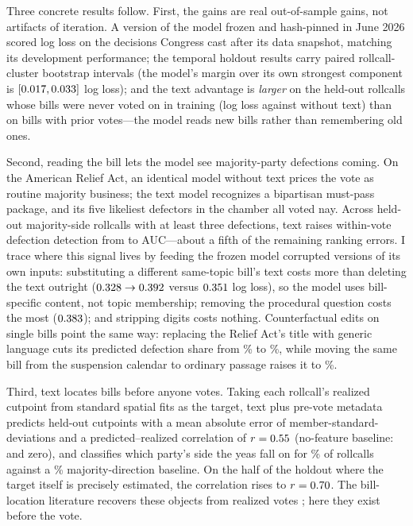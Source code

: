 \documentclass[12pt]{article}
\begin{document}
Three concrete results follow. First, the gains are real out-of-sample
gains, not artifacts of iteration. A version of the model frozen and
hash-pinned in June 2026 scored \prospectiveVoneLL{} log loss on the
\prospectiveN{} decisions Congress cast after its data snapshot,
matching its development performance; the temporal holdout results carry
paired rollcall-cluster bootstrap intervals (the model's margin over its
own strongest component is $[0.017, 0.033]$ log
loss); and the text advantage is \emph{larger} on the \freshRC{}
held-out rollcalls whose bills were never voted on in training (log loss
\freshLLchamp{} against \freshLLnotext{} without text) than on bills
with prior votes---the model reads new bills rather than remembering old
ones.

Second, reading the bill lets the model see majority-party defections
coming. On the American Relief Act, an identical model without text
prices the vote as routine majority business; the text model recognizes
a bipartisan must-pass package, and its five likeliest defectors in the
chamber all voted nay. Across \protRC{} held-out majority-side rollcalls
with at least three defections, text raises within-vote defection
detection from \protAUCnotext{} to \protAUCtext{} AUC---about a fifth of
the remaining ranking errors. I trace where this signal lives by feeding
the frozen model corrupted versions of its own inputs: substituting a
different same-topic bill's text costs more than deleting the text
outright ($0.328 \rightarrow 0.392$ versus $0.351$ log
loss), so the model uses bill-specific content, not topic membership;
removing the procedural question costs the most
($0.383$); and stripping digits costs nothing. Counterfactual edits
on single bills point the same way: replacing the Relief Act's title
with generic language cuts its predicted defection share from
\cfAraOrig\% to \cfAraGeneric\%, while moving the same bill from the
suspension calendar to ordinary passage raises it to \cfAraPassage\%.

Third, text locates bills before anyone votes. Taking each rollcall's
realized cutpoint from standard spatial fits as the target, text plus
pre-vote metadata predicts held-out cutpoints with a mean absolute error
of \cutComboMAE{} member-standard-deviations and a predicted--realized
correlation of $r = 0.55$ (no-feature baseline:
\cutConstMAE{} and zero), and classifies which party's side the yeas
fall on for \dirCombo\% of rollcalls against a \dirConst\%
majority-direction baseline. On the half of the holdout where the
target itself is precisely estimated, the correlation rises to
$r = 0.70$. The bill-location literature recovers these objects
from realized votes \citep{peress2013estimating, richman2011parties};
here they exist before the vote.
\end{document}
